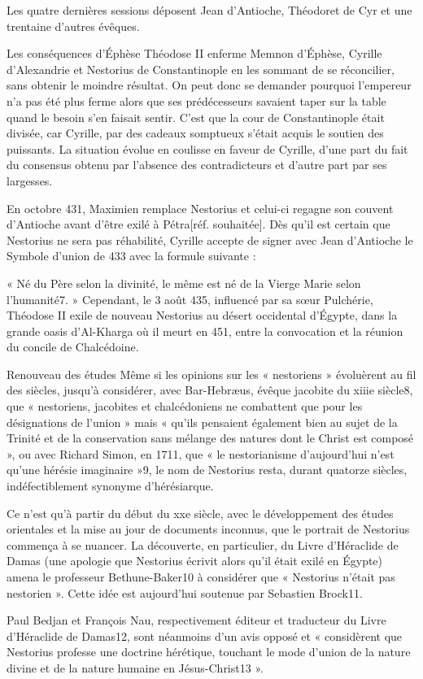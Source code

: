 Les quatre dernières sessions déposent Jean d'Antioche, Théodoret de Cyr et une trentaine d'autres évêques.

Les conséquences d'Éphèse
Théodose II enferme Memnon d'Éphèse, Cyrille d'Alexandrie et Nestorius de Constantinople en les sommant de se réconcilier, sans obtenir le moindre résultat. On peut donc se demander pourquoi l'empereur n'a pas été plus ferme alors que ses prédécesseurs savaient taper sur la table quand le besoin s'en faisait sentir. C'est que la cour de Constantinople était divisée, car Cyrille, par des cadeaux somptueux s'était acquis le soutien des puissants. La situation évolue en coulisse en faveur de Cyrille, d'une part du fait du consensus obtenu par l'absence des contradicteurs et d'autre part par ses largesses.

En octobre 431, Maximien remplace Nestorius et celui-ci regagne son couvent d'Antioche avant d'être exilé à Pétra[réf. souhaitée]. Dès qu'il est certain que Nestorius ne sera pas réhabilité, Cyrille accepte de signer avec Jean d'Antioche le Symbole d'union de 433 avec la formule suivante :

« Né du Père selon la divinité, le même est né de la Vierge Marie selon l'humanité7. »
Cependant, le 3 août 435, influencé par sa sœur Pulchérie, Théodose II exile de nouveau Nestorius au désert occidental d'Égypte, dans la grande oasis d'Al-Kharga où il meurt en 451, entre la convocation et la réunion du concile de Chalcédoine.

Renouveau des études
Même si les opinions sur les « nestoriens » évoluèrent au fil des siècles, jusqu'à considérer, avec Bar-Hebræus, évêque jacobite du xiiie siècle8, que « nestoriens, jacobites et chalcédoniens ne combattent que pour les désignations de l'union » mais « qu'ils pensaient également bien au sujet de la Trinité et de la conservation sans mélange des natures dont le Christ est composé », ou avec Richard Simon, en 1711, que « le nestorianisme d'aujourd'hui n'est qu'une hérésie imaginaire »9, le nom de Nestorius resta, durant quatorze siècles, indéfectiblement synonyme d'hérésiarque.

Ce n'est qu'à partir du début du xxe siècle, avec le développement des études orientales et la mise au jour de documents inconnus, que le portrait de Nestorius commença à se nuancer. La découverte, en particulier, du Livre d'Héraclide de Damas (une apologie que Nestorius écrivit alors qu'il était exilé en Égypte) amena le professeur Bethune-Baker10 à considérer que « Nestorius n'était pas nestorien ». Cette idée est aujourd'hui soutenue par Sebastien Brock11.

Paul Bedjan et François Nau, respectivement éditeur et traducteur du Livre d'Héraclide de Damas12, sont néanmoins d'un avis opposé et « considèrent que Nestorius professe une doctrine hérétique, touchant le mode d'union de la nature divine et de la nature humaine en Jésus-Christ13 ».